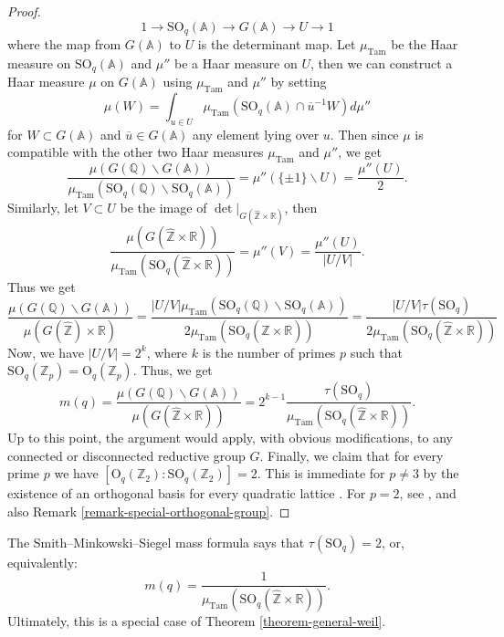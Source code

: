 \begin{proof}
\[
	1\rightarrow \text{SO}_q(\mathbb{A})\rightarrow G(\mathbb{A})\rightarrow U\rightarrow 1
\] 
where the map from $G(\mathbb{A})$ to $U$ is the determinant map. Let $\mu_{\text{Tam}}$ be the Haar measure on $\text{SO}_q(\mathbb{A})$ and $\mu''$ be a Haar measure on $U$, then we can construct a Haar measure $\mu$ on  $G(\mathbb{A})$ using $\mu_{\text{Tam}}$ and  $\mu''$ by setting 
\[
	\mu(W)=\int_{u\in U} \mu_{\text{Tam}}(\text{SO}_q(\mathbb{A})\cap \overline{u}^{-1}W)d\mu''
\] 
for $W\subset G(\mathbb{A})$ and $\overline{u}\in G(\mathbb{A})$ any element lying over $u$.
Then since $\mu$ is compatible with the other two Haar measures $\mu_{\text{Tam}}$ and $\mu''$, we get
\[
	\frac{\mu(G(\mathbb{Q})\backslash G(\mathbb{A}))}{\mu_{\text{Tam}}(\text{SO}_q(\mathbb{Q})\backslash\text{SO}_q(\mathbb{A}))}=\mu''(\{\pm 1\}\backslash U)=\frac{\mu''(U)}{2}. 
\] 
Similarly, let $V\subset U$ be the image of $\det|_{G(\hat{\mathbb{Z}}\times\mathbb{R})}$, then
 \[
	 \frac{\mu(G(\hat{\mathbb{Z}}\times \mathbb{R}))}{\mu_{\text{Tam}}(\text{SO}_q(\hat{\mathbb{Z}}\times \mathbb{R}))}=\mu''(V)=\frac{\mu''(U)}{|U/V|}.
\] 
Thus we get 
\[
	\frac{\mu(G(\mathbb{Q})\backslash G(\mathbb{A}))}{\mu(G(\hat{\mathbb{Z}})\times \mathbb{R})}= \frac{|U/V|\mu_{\text{Tam}}(\text{SO}_q(\mathbb{Q})\backslash \text{SO}_q(\mathbb{A}))}{2\mu_{\text{Tam}}(\text{SO}_q(\hat{\mathbb{Z}}\times \mathbb{R}))}= \frac{|U/V|\tau(\text{SO}_q)}{2\mu_{\text{Tam}}(\text{SO}_q(\hat{\mathbb{Z}}\times \mathbb{R}))}
\] 
Now, we have $|U/V| = 2^{k}$, where $k$ is the number of primes $p$ such that $\text{SO}_{q}(\mathbb{Z}_p)=\text{O}_{q}(\mathbb{Z}_p)$. Thus, we get
\[
	m(q)=\frac{\mu(G(\mathbb{Q})\backslash G(\mathbb{A}))}{\mu(G(\hat{\mathbb{Z}}\times \mathbb{R}))}=2^{k-1}\frac{\tau(\text{SO}_q)}{\mu_{\text{Tam}}(\text{SO}_q(\hat{\mathbb{Z}}\times \mathbb{R}))}.
\] 
Up to this point, the argument would apply, with obvious modifications, to any connected or disconnected reductive group $G$. Finally, we claim that for every prime $p$ we have $[\text{O}_q(\mathbb Z_2):\text{SO}_q(\mathbb Z_2)]=2$. This is immediate for $p\ne 3$ by the existence of an orthogonal basis for every quadratic lattice \cite[\S 92]{OMeara}. For $p=2$, see \cite[\S 93]{OMeara}, and also Remark \ref{remark-special-orthogonal-group}.
\end{proof}

\begin{remark}
\label{remark-SMS-formula}
The Smith--Minkowski--Siegel mass formula says that $\tau(\text{SO}_q)=2$, or, equivalently:
\begin{equation}
 \label{equation-SMSmassformula}
		m(q)=\frac{1}{\mu_{\text{Tam}}(\text{SO}_q(\hat{\mathbb{Z}}\times \mathbb{R}))}.
\end{equation}
Ultimately, this is a special case of Theorem \ref{theorem-general-weil}.
\end{remark}



